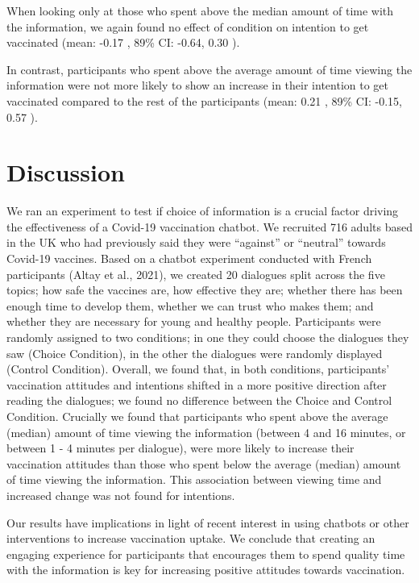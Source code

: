 \documentclass[
  english,
  ,jou,floatsintext]{apa6}
\begin{document}
When looking only at those who spent above the median amount of time with the information, we again found no effect of condition on intention to get vaccinated (mean: -0.17 , 89\% CI: -0.64, 0.30 ).

In contrast, participants who spent above the average amount of time viewing the information were not more likely to show an increase in their intention to get vaccinated compared to the rest of the participants (mean: 0.21 , 89\% CI: -0.15, 0.57 ).

\hypertarget{discussion}{%
\section{Discussion}\label{discussion}}

We ran an experiment to test if choice of information is a crucial factor driving the effectiveness of a Covid-19 vaccination chatbot. We recruited 716 adults based in the UK who had previously said they were ``against'' or ``neutral'' towards Covid-19 vaccines. Based on a chatbot experiment conducted with French participants (Altay et al., 2021), we created 20 dialogues split across the five topics; how safe the vaccines are, how effective they are; whether there has been enough time to develop them, whether we can trust who makes them; and whether they are necessary for young and healthy people. Participants were randomly assigned to two conditions; in one they could choose the dialogues they saw (Choice Condition), in the other the dialogues were randomly displayed (Control Condition). Overall, we found that, in both conditions, participants' vaccination attitudes and intentions shifted in a more positive direction after reading the dialogues; we found no difference between the Choice and Control Condition. Crucially we found that participants who spent above the average (median) amount of time viewing the information (between 4 and 16 minutes, or between 1 - 4 minutes per dialogue), were more likely to increase their vaccination attitudes than those who spent below the average (median) amount of time viewing the information. This association between viewing time and increased change was not found for intentions.

Our results have implications in light of recent interest in using chatbots or other interventions to increase vaccination uptake. We conclude that creating an engaging experience for participants that encourages them to spend quality time with the information is key for increasing positive attitudes towards vaccination.
\end{document}
